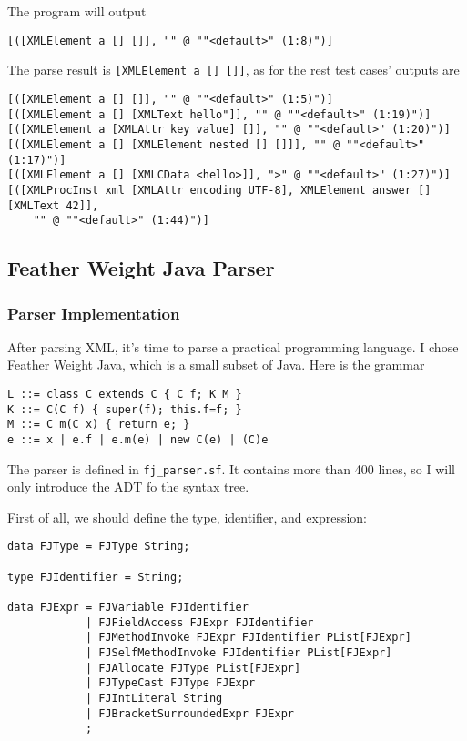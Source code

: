 The program will output

\begin{lstlisting}
[([XMLElement a [] []], "" @ ""<default>" (1:8)")]
\end{lstlisting}

The parse result is \texttt{[XMLElement a [] []]}, as for the rest test cases' outputs are

\begin{lstlisting}
[([XMLElement a [] []], "" @ ""<default>" (1:5)")]
[([XMLElement a [] [XMLText hello"]], "" @ ""<default>" (1:19)")]
[([XMLElement a [XMLAttr key value] []], "" @ ""<default>" (1:20)")]
[([XMLElement a [] [XMLElement nested [] []]], "" @ ""<default>" (1:17)")]
[([XMLElement a [] [XMLCData <hello>]], ">" @ ""<default>" (1:27)")]
[([XMLProcInst xml [XMLAttr encoding UTF-8], XMLElement answer [] [XMLText 42]],
    "" @ ""<default>" (1:44)")]
\end{lstlisting}

\subsection{Feather Weight Java Parser}

\subsubsection{Parser Implementation}

After parsing XML, it's time to parse a practical programming language. I chose Feather Weight Java, which is a small subset of Java. Here is the grammar

\begin{lstlisting}[language={}]
L ::= class C extends C { C f; K M }
K ::= C(C f) { super(f); this.f=f; }
M ::= C m(C x) { return e; }
e ::= x | e.f | e.m(e) | new C(e) | (C)e
\end{lstlisting}

The parser is defined in \texttt{fj\_parser.sf}. It contains more than 400 lines, so I will only introduce the ADT fo the syntax tree.

First of all, we should define the type, identifier, and expression:

\begin{lstlisting}
data FJType = FJType String;

type FJIdentifier = String;

data FJExpr = FJVariable FJIdentifier
            | FJFieldAccess FJExpr FJIdentifier
            | FJMethodInvoke FJExpr FJIdentifier PList[FJExpr]
            | FJSelfMethodInvoke FJIdentifier PList[FJExpr]
            | FJAllocate FJType PList[FJExpr]
            | FJTypeCast FJType FJExpr
            | FJIntLiteral String
            | FJBracketSurroundedExpr FJExpr
            ;
\end{lstlisting}

